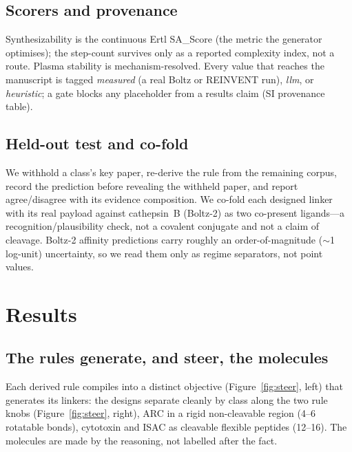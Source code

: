 \documentclass[10pt]{article}
\begin{document}
\subsection{Scorers and provenance}
Synthesizability is the continuous Ertl SA\_Score (the metric the generator optimises); the step-count survives only as a reported complexity index, not a route. Plasma stability is mechanism-resolved. Every value that reaches the manuscript is tagged \emph{measured} (a real Boltz or REINVENT run), \emph{llm}, or \emph{heuristic}; a gate blocks any placeholder from a results claim (SI provenance table).

\subsection{Held-out test and co-fold}
We withhold a class's key paper, re-derive the rule from the remaining corpus, record the prediction before revealing the withheld paper, and report agree/disagree with its evidence composition. We co-fold each designed linker with its real payload against cathepsin~B (Boltz-2) as two co-present ligands---a recognition/plausibility check, not a covalent conjugate and not a claim of cleavage. Boltz-2 affinity predictions carry roughly an order-of-magnitude ($\sim$1 log-unit) uncertainty, so we read them only as regime separators, not point values.
\section{Results}\subsection{The rules generate, and steer, the molecules}
Each derived rule compiles into a distinct objective (Figure~\ref{fig:steer}, left) that generates its linkers: the designs separate cleanly by class along the two rule knobs (Figure~\ref{fig:steer}, right), ARC in a rigid non-cleavable region (4--6 rotatable bonds), cytotoxin and ISAC as cleavable flexible peptides (12--16). The molecules are made by the reasoning, not labelled after the fact.
\end{document}
